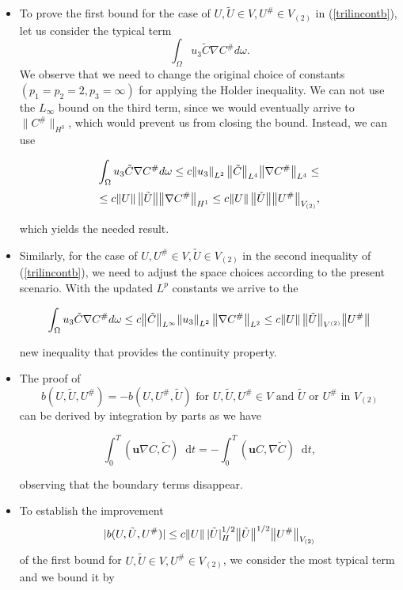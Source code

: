 \documentclass[11pt]{article}
\newcommand*\diff{\mathop{}\!\mathrm{d}}
\begin{document}
\begin{itemize}
\item To prove the first bound for the case of $U, \tilde{U} \in V, U^\# \in V_{(2)}$ in (\ref{trilincontb}), let us consider the typical term $$ \int_\Omega u_3 \tilde{C} \nabla C^\# d \omega.$$ We observe that we need to change the original choice of constants $(p_1 = p_2 = 2, p_3 = \infty)$ for applying the Holder inequality. We can not use the $L_\infty$ bound on the third term, since we would eventually arrive to $\big \| C^\# \big \| _{H^3}$, which would prevent us from closing the bound. Instead, we can use

\[ \int_\Omega u_3 \tilde{C} \nabla C^\# d \omega \leq c \norm{u_3}_{L^2} \big \| \tilde{C} \big \| _{L^4} \big \| \nabla C^\# \big \| _{L^4} \leq \]
\[ \leq c \norm{U} \big \|\tilde{U}\big \| \big \|\nabla C^\# \big \|_{H^1} \leq c \norm{U} \big \|\tilde{U}\big \| \big \| U^\# \big \|_{V_{(2)}}, \]

which yields the needed result.

\item Similarly, for the case of $U, U^\# \in V, \tilde{U} \in V_{(2)}$ in the second inequality of (\ref{trilincontb}), we need to adjust the space choices according to the present scenario. With the updated $L^p$ constants we arrive to the

\[ \int_\Omega u_3 \tilde{C} \nabla C^\# d \omega \leq c \big \| \tilde{C} \big \| _{L^\infty} \norm{ u_3}_{L^2}\big \| \nabla C^\# \big \| _{L^2} \leq c \norm{U} \big \|\tilde{U}\big \| _{V^{(2)}} \big \| U^\# \big \| \]

new inequality that provides the continuity property.

\item The proof of $$b(U, \tilde{U}, U^\# ) = - b(U, U^\#, \tilde{U} ) \text{ for } U, \tilde{U}, U^\# \in V \text{ and } \tilde{U} \text{ or } U^\# \text{ in } V_{(2)}$$ can be derived by integration by parts as we have

\[ \int_0 ^T (\mathbf{u} \nabla C, \tilde{C}) \diff t = - \int_0 ^T ( \mathbf{u} C, \nabla \tilde{C}) \diff t, \]

observing that the boundary terms disappear.

\item To establish the improvement $$ \lvert b(U, \tilde{U}, U^\#) \rvert \leq c \norm{U} \lvert \tilde{U} \rvert _H^{1/2} \big \| \tilde{U} \big \| ^{1/2} \big \| U^\# \big \| _{V_{(2)}} $$ of the first bound for $U, \tilde{U} \in V, U^{\#} \in V_{(2)}$, we consider the most typical term and we bound it by


\end{itemize}
\end{document}
